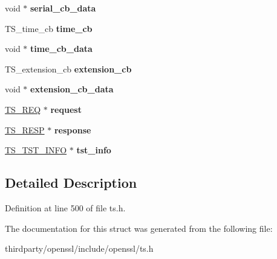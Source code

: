 \begin{DoxyCompactItemize}
\item 
\mbox{\label{struct_t_s__resp__ctx_a428e1ae893e00dea7088a4caed4ff52b}} 
void $\ast$ {\bfseries serial\+\_\+cb\+\_\+data}
\item 
\mbox{\label{struct_t_s__resp__ctx_a838a0b82016f7bcf6aabe4102f1a4ac8}} 
T\+S\+\_\+time\+\_\+cb {\bfseries time\+\_\+cb}
\item 
\mbox{\label{struct_t_s__resp__ctx_aa818a3e3400ed231cf9b6fb084fe5cd6}} 
void $\ast$ {\bfseries time\+\_\+cb\+\_\+data}
\item 
\mbox{\label{struct_t_s__resp__ctx_a76759785bdc0835a4501abdd72954561}} 
T\+S\+\_\+extension\+\_\+cb {\bfseries extension\+\_\+cb}
\item 
\mbox{\label{struct_t_s__resp__ctx_aa732cb381d3c1f66e3097adff0df24f0}} 
void $\ast$ {\bfseries extension\+\_\+cb\+\_\+data}
\item 
\mbox{\label{struct_t_s__resp__ctx_a9c66652878d500b08d3c36e258a4d974}} 
\hyperlink{struct_t_s__req__st}{T\+S\+\_\+\+R\+EQ} $\ast$ {\bfseries request}
\item 
\mbox{\label{struct_t_s__resp__ctx_aff6fbaf908c062da548fb3e319d5ac68}} 
\hyperlink{struct_t_s__resp__st}{T\+S\+\_\+\+R\+E\+SP} $\ast$ {\bfseries response}
\item 
\mbox{\label{struct_t_s__resp__ctx_a314c23ef39b07c6119b982b9677c844e}} 
\hyperlink{struct_t_s__tst__info__st}{T\+S\+\_\+\+T\+S\+T\+\_\+\+I\+N\+FO} $\ast$ {\bfseries tst\+\_\+info}
\end{DoxyCompactItemize}


\subsection{Detailed Description}


Definition at line 500 of file ts.\+h.



The documentation for this struct was generated from the following file\+:\begin{DoxyCompactItemize}
\item 
thirdparty/openssl/include/openssl/ts.\+h\end{DoxyCompactItemize}

